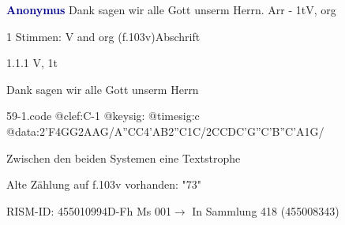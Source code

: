 \documentclass[twocolumn, 12pt]{book}
\begin{document}
\par \vspace{16pt} \textcolor{darkblue}{\textbf{Anonymus  }}\hfillplus{\textbf{[59]}}\newline Dank sagen wir alle Gott unserm Herrn. Arr - 1t\newline V, org
\par \begin{itshape}\end{itshape} 
\par \textcolor{darkblue}{}  1 Stimmen: V and org  (f.103v)\newline Abschrift
\par 1.1.1  V, 1t\newline \begin{footnotesize} Dank sagen wir alle Gott unserm Herrn \end{footnotesize}  
\begin{filecontents*}{59-1.code}
@clef:C-1
@keysig:
@timesig:c
@data:2'F4GG2AAG/A''CC4'AB2''C1C/2CCDC'G''C'B''C'A1G/
\end{filecontents*}
\newline %
\par Zwischen den beiden Systemen eine Textstrophe
\par Alte Zählung auf f.103v vorhanden: "73"
\par RISM-ID: 455010994\newline D-Fh  Ms 001\newline $\rightarrow$ In Sammlung 418 (455008343)
      
\end{document}
